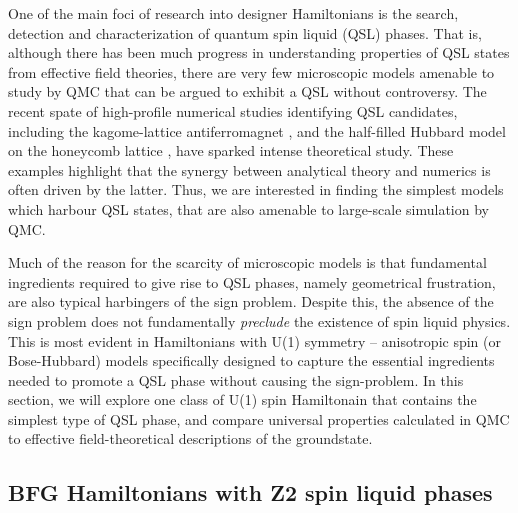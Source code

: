 \documentclass[range]{ar2e}
\begin{document}
One of the main foci of research into designer Hamiltonians is the search, detection and characterization of quantum spin liquid (QSL) phases.  
That is, although there has been much progress in understanding properties of QSL states from effective field theories, there are very few microscopic models amenable to study by QMC that can be argued to exhibit a QSL without controversy.
The recent spate of high-profile numerical studies identifying QSL candidates, including the kagome-lattice antiferromagnet \cite{Yan}, and the half-filled Hubbard model on the honeycomb lattice \cite{Meng}, have sparked intense theoretical study.   
These examples highlight that the synergy between analytical theory and numerics is often driven by the latter.  Thus, we are interested in finding the simplest models which harbour QSL states, that are also amenable to large-scale simulation by QMC.

Much of the reason for the scarcity of microscopic models is that fundamental ingredients required to give rise to QSL phases, namely geometrical frustration, are also typical harbingers of the sign problem.  Despite this, the absence of the sign problem does not fundamentally {\it preclude} the existence of spin liquid physics.  This is most evident in Hamiltonians with U(1) symmetry -- anisotropic spin (or Bose-Hubbard) models specifically designed to capture the essential ingredients needed to promote a QSL phase without causing the sign-problem.  In this section, we will explore one class of U(1) spin Hamiltonain that contains the simplest type of QSL phase, and compare universal properties calculated in QMC to effective field-theoretical descriptions of the groundstate.

\subsection{BFG Hamiltonians with Z2 spin liquid phases}

\end{document}
